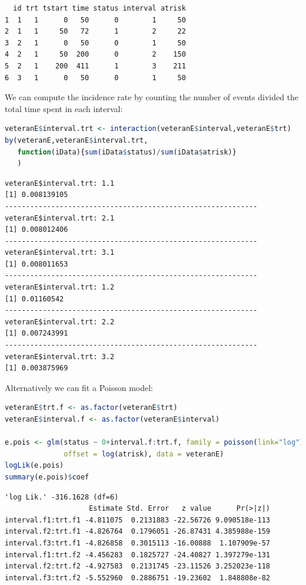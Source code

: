 \documentclass{article}
\begin{document}
\label{}
\begin{verbatim}
  id trt tstart time status interval atrisk
1  1   1      0   50      0        1     50
2  1   1     50   72      1        2     22
3  2   1      0   50      0        1     50
4  2   1     50  200      0        2    150
5  2   1    200  411      1        3    211
6  3   1      0   50      0        1     50
\end{verbatim}


We can compute the incidence rate by counting the number of events
divided the total time spent in each interval:
\begin{lstlisting}[language=r,numbers=none]
veteranE$interval.trt <- interaction(veteranE$interval,veteranE$trt)
by(veteranE,veteranE$interval.trt,
   function(iData){sum(iData$status)/sum(iData$atrisk)}
   )
\end{lstlisting}

\label{}
\begin{verbatim}
veteranE$interval.trt: 1.1
[1] 0.008139105
------------------------------------------------------------ 
veteranE$interval.trt: 2.1
[1] 0.008012406
------------------------------------------------------------ 
veteranE$interval.trt: 3.1
[1] 0.008011653
------------------------------------------------------------ 
veteranE$interval.trt: 1.2
[1] 0.01160542
------------------------------------------------------------ 
veteranE$interval.trt: 2.2
[1] 0.007243991
------------------------------------------------------------ 
veteranE$interval.trt: 3.2
[1] 0.003875969
\end{verbatim}

Alternatively we can fit a Poisson model:
\begin{lstlisting}[language=r,numbers=none]
veteranE$trt.f <- as.factor(veteranE$trt)
veteranE$interval.f <- as.factor(veteranE$interval)

e.pois <- glm(status ~ 0+interval.f:trt.f, family = poisson(link="log"),
              offset = log(atrisk), data = veteranE)
logLik(e.pois)
summary(e.pois)$coef
\end{lstlisting}

\label{}
\begin{verbatim}
'log Lik.' -316.1628 (df=6)
                    Estimate Std. Error   z value      Pr(>|z|)
interval.f1:trt.f1 -4.811075  0.2131883 -22.56726 9.090518e-113
interval.f2:trt.f1 -4.826764  0.1796051 -26.87431 4.385988e-159
interval.f3:trt.f1 -4.826858  0.3015113 -16.00888  1.107909e-57
interval.f1:trt.f2 -4.456283  0.1825727 -24.40827 1.397279e-131
interval.f2:trt.f2 -4.927583  0.2131745 -23.11526 3.252023e-118
interval.f3:trt.f2 -5.552960  0.2886751 -19.23602  1.848808e-82
\end{verbatim}
\end{document}
